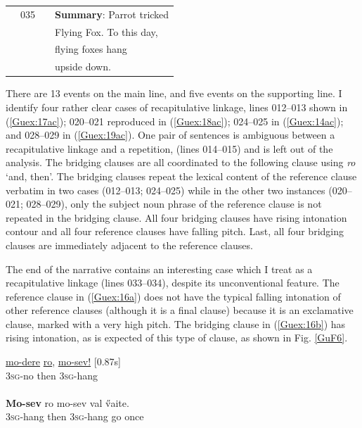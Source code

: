 \documentclass[output=paper]{LSP/langsci}
\begin{document}
\begin{table}[]
\begin{tabular}{llll}
                                               & 035               &                 & \textbf{Summary}:  Parrot tricked                     \\
                                                 &                   &                 & Flying Fox. To this day,                  \\
                                              &                   &                 &  flying foxes hang       \\
                                              &                   &                 &        upside   down.                  \\ 
\end{tabular}
\end{table}



There are 13 events on the main line, and five events on the supporting line. I identify four rather clear cases of recapitulative linkage, lines 012--013  shown in (\ref{Guex:17ac}); 020--021 reproduced in (\ref{Guex:18ac}); 024--025 in (\ref{Guex:14ac}); and 028--029 in (\ref{Guex:19ac}). One pair of sentences is ambiguous between a recapitulative linkage and a repetition, (lines 014--015) and is left out of the analysis.  The bridging clauses are all coordinated to the following clause using \textit{ro} `and, then'.  The bridging clauses repeat the lexical content of the reference clause verbatim in two cases (012--013; 024--025) while in the other two instances (020--021; 028--029), only the subject noun phrase of the reference clause is not repeated in the bridging clause. All four bridging clauses have rising intonation contour and all four reference clauses have falling pitch. Last, all four bridging clauses are immediately adjacent to the reference clauses. 

The end of the narrative contains an interesting case which I treat as a recapitulative linkage (lines 033--034), despite its unconventional feature. The reference clause in (\ref{Guex:16a}) does not have the typical falling intonation of other reference clauses (although it is a final clause) because it is  an exclamative clause, marked with a very high pitch. The bridging clause in (\ref{Guex:16b}) has rising intonation, as is expected of this type of clause, as shown in Fig. \ref{GuF6}.

\begin{exe}
\ex \label{Guex:16ab}
\begin{xlist}
\ex \label{Guex:16a}
\gll \underline{mo-dere}          \underline{ro},                 \underline{mo-sev!}     [0.87s]\\
\textsc{3sg}-no     then  \textsc{3sg}-hang \\
\glt {}\\
\ex \label{Guex:16b}
\gll  \textbf{Mo-sev}       ro mo-sev         val   \H{v}aite.\\     	       
 \textsc{3sg}-hang   then   \textsc{3sg}-hang     go    once\\
\glt {} 
\end{xlist}
\end{exe}
\end{document}
